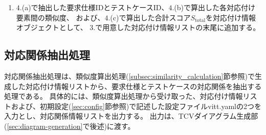 \begin{enumerate}
\begin{enumerate}
        \begin{equation}
            S_{\text{total}} = w_{\text{precondition}} \cdot S_{\text{pre}} + w_{\text{trigger\_operation}} \cdot S_{\text{trig}} + w_{\text{response\_output}} \cdot S_{\text{resp}}\label{eq:total_score}
        \end{equation}

        ここで、$S_{\text{pre}}$は前提条件と事前条件の類似度、$S_{\text{trig}}$はトリガーと操作の類似度、$S_{\text{resp}}$はシステム応答と期待出力の類似度である。

        \item $4$.(a)で抽出した要求仕様IDとテストケースID、$4$.(b)で算出した各対応付け要素間の類似度、
        および、$4$.(c)で算出した合計スコア$S_{\text{total}}$を対応付け情報オブジェクトとして、
        $3$.で用意した対応付け情報リストの末尾に追加する。
    \end{enumerate}
\end{enumerate}

\subsection{対応関係抽出処理}\label{sec:traceability_extraction_processing}
対応関係抽出処理は、類似度算出処理(\cref{subsec:similarity_calculation}節参照)で生成した対応付け情報リストから、要求仕様とテストケースの対応関係を抽出する処理である。
具体的には、類似度算出処理から受け取った、対応付け情報リストおよび、初期設定(\ref{sec:config}節参照)で記述した設定ファイルvitt.yamlの2つを入力とし、対応関係情報リストを出力する。
出力は、TCVダイアグラム生成部(\cref{sec:diagram-generation}で後述)に渡す。

